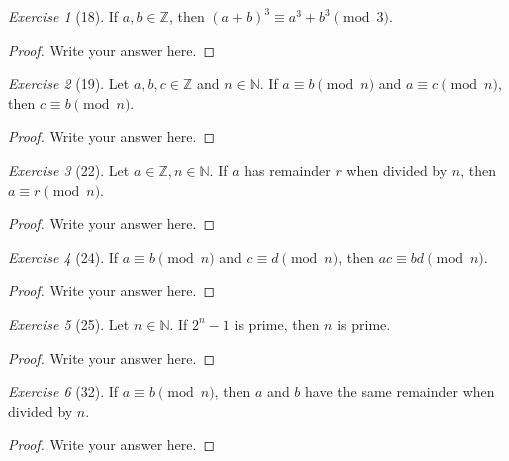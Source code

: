 \documentclass[12pt]{amsart}
\theoremstyle{remark}
\newtheorem*{exercise}{Exercise}%
\def\NN{\ensuremath{\mathbb N}}
\def\ZZ{\ensuremath{\mathbb Z}}
\theoremstyle{mycomment}
\begin{document}
\begin{exercise}[18] If $a,b\in\ZZ$, then $(a+b)^{3}\equiv a^{3}+b^{3}\pmod 3$. %
\begin{proof}
Write your answer here.
\end{proof}
\end{exercise}

\begin{exercise}[19] Let $a,b,c\in\ZZ$ and $n\in\NN$. If $a\equiv b\pmod n$ and $a\equiv c\pmod n$, then $c\equiv b\pmod n$.
\begin{proof}
Write your answer here.
\end{proof}
\end{exercise}

\begin{exercise}[22] Let $a\in\ZZ, n\in\NN$. If $a$ has remainder $r$ when divided by $n$, then $a\equiv r\pmod n$.
\begin{proof}
Write your answer here.
\end{proof}
\end{exercise}

\begin{exercise}[24] If $a\equiv b\pmod n$ and $c\equiv d\pmod n$, then $ac\equiv bd\pmod n$.
\begin{proof}
Write your answer here.
\end{proof}
\end{exercise}


\begin{exercise}[25] Let $n\in\NN$. If $2^{n}-1$ is prime, then $n$ is prime.
\begin{proof}
Write your answer here.
\end{proof}
\end{exercise}

\begin{exercise}[32] If $a\equiv b\pmod n$, then $a$ and $b$ have the same remainder when divided by $n$.
\begin{proof}
Write your answer here.
\end{proof}
\end{exercise}





 
\end{document}
